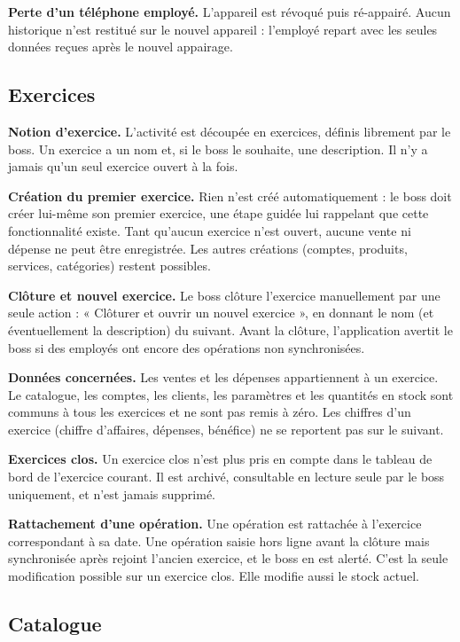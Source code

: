 \documentclass[11pt,a4paper]{article}
\newcommand{\fonc}[2]{\textbf{#1.} #2\par\vspace{0.2em}}
\begin{document}
	\fonc{Perte d'un téléphone employé}{L'appareil est révoqué puis ré-appairé. Aucun historique n'est restitué sur le nouvel appareil : l'employé repart avec les seules données reçues après le nouvel appairage.}
	
	\subsection{Exercices}
	
	\fonc{Notion d'exercice}{L'activité est découpée en exercices, définis librement par le boss. Un exercice a un nom et, si le boss le souhaite, une description. Il n'y a jamais qu'un seul exercice ouvert à la fois.}
	
	\fonc{Création du premier exercice}{Rien n'est créé automatiquement : le boss doit créer lui-même son premier exercice, une étape guidée lui rappelant que cette fonctionnalité existe. Tant qu'aucun exercice n'est ouvert, aucune vente ni dépense ne peut être enregistrée. Les autres créations (comptes, produits, services, catégories) restent possibles.}
	
	\fonc{Clôture et nouvel exercice}{Le boss clôture l'exercice manuellement par une seule action : « Clôturer et ouvrir un nouvel exercice », en donnant le nom (et éventuellement la description) du suivant. Avant la clôture, l'application avertit le boss si des employés ont encore des opérations non synchronisées.}
	
	\fonc{Données concernées}{Les ventes et les dépenses appartiennent à un exercice. Le catalogue, les comptes, les clients, les paramètres et les quantités en stock sont communs à tous les exercices et ne sont pas remis à zéro. Les chiffres d'un exercice (chiffre d'affaires, dépenses, bénéfice) ne se reportent pas sur le suivant.}
	
	\fonc{Exercices clos}{Un exercice clos n'est plus pris en compte dans le tableau de bord de l'exercice courant. Il est archivé, consultable en lecture seule par le boss uniquement, et n'est jamais supprimé.}
	
	\fonc{Rattachement d'une opération}{Une opération est rattachée à l'exercice correspondant à sa date. Une opération saisie hors ligne avant la clôture mais synchronisée après rejoint l'ancien exercice, et le boss en est alerté. C'est la seule modification possible sur un exercice clos. Elle modifie aussi le stock actuel.}
	
	\subsection{Catalogue}
	
\end{document}
